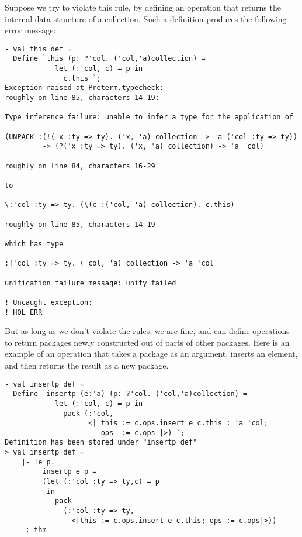 Suppose we try to violate this rule, by defining an operation that returns
the internal data structure of a collection.
%
Such a definition produces the following error message:
\begin{session}
\begin{verbatim}
- val this_def =
  Define `this (p: ?'col. ('col,'a)collection) =
            let (:'col, c) = p in
              c.this `;
Exception raised at Preterm.typecheck:
roughly on line 85, characters 14-19:

Type inference failure: unable to infer a type for the application of

(UNPACK :(!('x :ty => ty). ('x, 'a) collection -> 'a ('col :ty => ty))
         -> (?('x :ty => ty). ('x, 'a) collection) -> 'a 'col)

roughly on line 84, characters 16-29

to

\:'col :ty => ty. (\(c :('col, 'a) collection). c.this)

roughly on line 85, characters 14-19

which has type

:!'col :ty => ty. ('col, 'a) collection -> 'a 'col

unification failure message: unify failed

! Uncaught exception:
! HOL_ERR
\end{verbatim}
\end{session}

But as long as we don't violate the rules, we are fine, and can define operations to
return packages newly constructed out of parts of other packages.
Here is an example of an operation that takes a package as an argument, inserts an element,
and then returns the result as a new package.
\begin{session}
\begin{verbatim}
- val insertp_def =
  Define `insertp (e:'a) (p: ?'col. ('col,'a)collection) =
            let (:'col, c) = p in
              pack (:'col,
                    <| this := c.ops.insert e c.this : 'a 'col;
                       ops  := c.ops |>) `;
Definition has been stored under "insertp_def"
> val insertp_def =
    |- !e p.
         insertp e p =
         (let (:'col :ty => ty,c) = p
          in
            pack
              (:'col :ty => ty,
                <|this := c.ops.insert e c.this; ops := c.ops|>))
     : thm
\end{verbatim}
\end{session}

